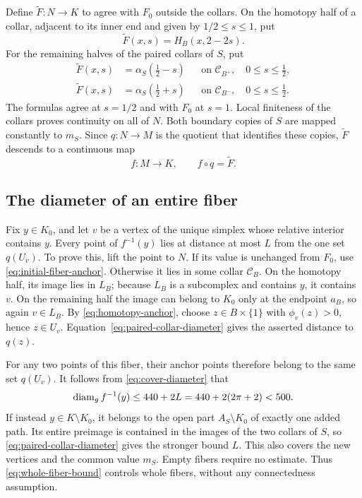 Define $\widetilde F:N\to K$ to agree with $F_0$ outside
the collars.  On the homotopy half of a collar, adjacent
to its inner end and given by $1/2\le s\le1$, put
\[
 \widetilde F(x,s)=H_B(x,2-2s).
\]
For the remaining halves of the paired collars of $S$, put
\begin{equation}
\label{eq:arc-collar-map}
 \begin{aligned}
 \widetilde F(x,s)&=\alpha_S(\tfrac12-s)
       &&\text{on }\mathcal C_{B^+},\quad 0\le s\le\tfrac12,\\
 \widetilde F(x,s)&=\alpha_S(\tfrac12+s)
       &&\text{on }\mathcal C_{B^-},\quad 0\le s\le\tfrac12.
 \end{aligned}
\end{equation}
The formulas agree at $s=1/2$ and with $F_0$ at $s=1$.
Local finiteness of the collars proves continuity on all of
$N$.  Both boundary copies of $S$ are mapped constantly to
$m_S$.  Since $q:N\to M$ is the quotient that identifies
these copies, $\widetilde F$ descends to a continuous map
\begin{equation}
\label{eq:final-graph-map}
 f:M\longrightarrow K,\qquad f\circ q=\widetilde F.
\end{equation}

\subsection{The diameter of an entire fiber}

Fix $y\in K_0$, and let $v$ be a vertex of the unique
simplex whose relative interior contains $y$.  Every point
of $f^{-1}(y)$ lies at distance at most $L$ from the one
set $q(U_v)$.  To prove this, lift the point to $N$.  If
its value is unchanged from $F_0$, use
\eqref{eq:initial-fiber-anchor}.  Otherwise it lies in some
collar $\mathcal C_B$.  On the homotopy half, its image
lies in $L_B$; because $L_B$ is a subcomplex and contains
$y$, it contains $v$.  On the remaining half the image can
belong to $K_0$ only at the endpoint $a_B$, so again
$v\in L_B$.  By \eqref{eq:homotopy-anchor}, choose
$z\in B\times\{1\}$ with $\phi_v(z)>0$, hence
$z\in U_v$.  Equation~\eqref{eq:paired-collar-diameter}
gives the asserted distance to $q(z)$.

For any two points of this fiber, their anchor points
therefore belong to the same set $q(U_v)$.  It follows
from \eqref{eq:cover-diameter} that
\begin{equation}
\label{eq:whole-fiber-bound}
 \operatorname{diam}_g f^{-1}(y)\le440+2L
 =440+2(2\pi+2)<500.
\end{equation}
If instead $y\in K\setminus K_0$, it belongs to the
open part $A_S\setminus K_0$ of exactly one added path.  Its entire
preimage is contained in the images of the two collars
of $S$, so \eqref{eq:paired-collar-diameter} gives the
stronger bound $L$.  This also covers the new vertices
and the common value $m_S$.  Empty fibers require no
estimate.  Thus \eqref{eq:whole-fiber-bound} controls
whole fibers, without any connectedness assumption.

